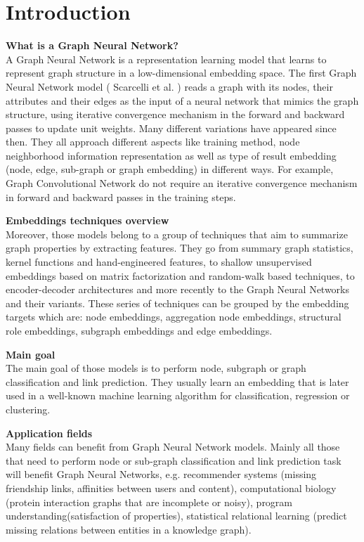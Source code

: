 \documentclass[a4paper]{article}
\begin{document}
\section{Introduction}

\textbf{What is a Graph Neural Network?} \\
A Graph Neural Network is a representation learning model that learns to represent graph structure in a low-dimensional embedding space. The first Graph Neural Network model ( Scarcelli et al. \cite{Scarselli}) reads a graph with its nodes, their attributes and their edges as the input of a neural network that mimics the graph structure, using iterative convergence mechanism in the forward and backward passes to update unit weights. 
Many different variations have appeared since then. They all approach different aspects like training method, node neighborhood information representation as well as type of result embedding (node, edge, sub-graph or graph embedding) in different ways. For example, Graph Convolutional Network do not require an iterative convergence mechanism in forward and backward passes in the training steps. 

\textbf{Embeddings techniques overview} \\
Moreover, those models belong to a group of techniques that aim to summarize graph properties by extracting features. They go from summary graph statistics, kernel functions and hand-engineered features, to shallow unsupervised embeddings based on matrix factorization and random-walk based techniques, to encoder-decoder architectures and more recently to the Graph Neural Networks and their variants. These series of techniques can be grouped by the embedding targets which are: node embeddings, aggregation node embeddings, structural role embeddings, subgraph embeddings and edge embeddings.

\textbf{Main goal} \\
The main goal of those models is to perform node, subgraph or graph classification and link prediction. They usually learn an embedding that is later used in a well-known machine learning algorithm for classification, regression or clustering.

\textbf{Application fields}\\
Many fields can benefit from Graph Neural Network models. Mainly all those that need to perform node or sub-graph classification and link prediction task will benefit Graph Neural Networks, e.g. recommender systems (missing friendship links, affinities between users and content), computational biology (protein interaction graphs that are incomplete or noisy), program understanding(satisfaction of properties), statistical relational learning (predict missing relations between entities in a knowledge graph).
\end{document}
